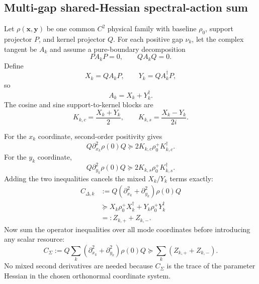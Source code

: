 
\subsection{Multi-gap shared-Hessian spectral-action sum}
\label{supp:multigap-full-proof}

Let $\rho(\bm x,\bm y)$ be one common $C^2$ physical family with baseline $\rho_0$, support projector $P$, and kernel projector $Q$. For each positive gap $\nu_k$, let the complex tangent be $A_k$ and assume a pure-boundary decomposition
\begin{equation}
P A_k P=0,
\qquad
Q A_k Q=0.
\end{equation}
Define
\begin{equation}
X_k=Q A_k P,
\qquad
Y_k=Q A_k^\dagger P,
\end{equation}
so
\begin{equation}
A_k=X_k+Y_k^\dagger.
\end{equation}
The cosine and sine support-to-kernel blocks are
\begin{equation}
K_{k,c}=\frac{X_k+Y_k}{2},
\qquad
K_{k,s}=\frac{X_k-Y_k}{2i}.
\end{equation}

For the $x_k$ coordinate, second-order positivity gives
\begin{equation}
Q\partial_{x_k}^2\rho(0)Q
\succeq2K_{k,c}\rho_0^+K_{k,c}^\dagger.
\end{equation}
For the $y_k$ coordinate,
\begin{equation}
Q\partial_{y_k}^2\rho(0)Q
\succeq2K_{k,s}\rho_0^+K_{k,s}^\dagger.
\end{equation}
Adding the two inequalities cancels the mixed $X_k/Y_k$ terms exactly:
\begin{align}
C_{\Delta,k}
&:=Q(\partial_{x_k}^2+\partial_{y_k}^2)\rho(0)Q\\
&\succeq
X_k\rho_0^+X_k^\dagger
+Y_k\rho_0^+Y_k^\dagger\\
&=:Z_{k,+}+Z_{k,-}.
\label{eq:mode-shared-curvature-proof}
\end{align}
Now sum the operator inequalities over all mode coordinates before introducing any scalar resource:
\begin{equation}
\boxed{
C_\Sigma
:=Q\sum_k(\partial_{x_k}^2+\partial_{y_k}^2)\rho(0)Q
\succeq
\sum_k(Z_{k,+}+Z_{k,-}).
}
\label{eq:common-hessian-proof}
\end{equation}
No mixed second derivatives are needed because $C_\Sigma$ is the trace of the parameter Hessian in the chosen orthonormal coordinate system.

